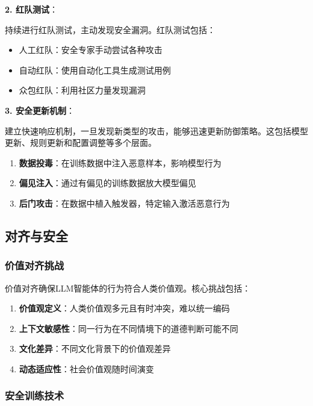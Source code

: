 \textbf{2. 红队测试}：

持续进行红队测试，主动发现安全漏洞。红队测试包括：
\begin{itemize}[leftmargin=2em]
    \item 人工红队：安全专家手动尝试各种攻击
    \item 自动红队：使用自动化工具生成测试用例
    \item 众包红队：利用社区力量发现漏洞
\end{itemize}

\textbf{3. 安全更新机制}：

建立快速响应机制，一旦发现新类型的攻击，能够迅速更新防御策略。这包括模型更新、规则更新和配置调整等多个层面。

\begin{enumerate}[leftmargin=2em]
    \item \textbf{数据投毒}：在训练数据中注入恶意样本，影响模型行为
    \item \textbf{偏见注入}：通过有偏见的训练数据放大模型偏见
    \item \textbf{后门攻击}：在数据中植入触发器，特定输入激活恶意行为
\end{enumerate}

\subsection{对齐与安全}

\subsubsection{价值对齐挑战}

价值对齐确保LLM智能体的行为符合人类价值观。核心挑战包括：

\begin{enumerate}[leftmargin=2em]
    \item \textbf{价值观定义}：人类价值观多元且有时冲突，难以统一编码
    \item \textbf{上下文敏感性}：同一行为在不同情境下的道德判断可能不同
    \item \textbf{文化差异}：不同文化背景下的价值观差异
    \item \textbf{动态适应性}：社会价值观随时间演变
\end{enumerate}

\subsubsection{安全训练技术}

